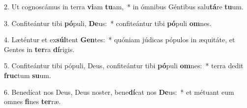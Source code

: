2. Ut cognoscámus in terra \textbf{vi}am \textbf{tu}am,~*  in ómnibus Géntibus salu\textbf{tá}re \textbf{tu}um.\

3. Confiteántur tibi \textbf{pó}puli, \textbf{De}us:~*  confiteántur tibi \textbf{pó}puli \textbf{om}nes.\

4. Læténtur et ex\textbf{súl}tent \textbf{Gen}tes:~*  quóniam júdicas pópulos in æquitáte, et Gentes in \textbf{ter}ra \textbf{dí}rigis.\

5. Confiteántur tibi pópuli, Deus, confiteántur tibi \textbf{pó}puli \textbf{om}nes:~*  terra dedit \textbf{fruc}tum \textbf{su}um.\

6. Benedícat nos Deus, Deus noster, bene\textbf{dí}cat nos \textbf{De}us:~*  et métuant eum omnes \textbf{fi}nes \textbf{ter}ræ.\

